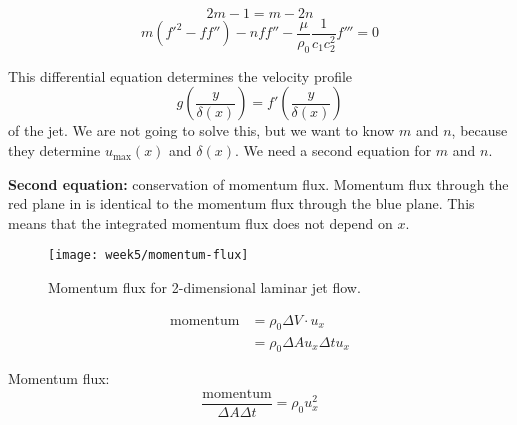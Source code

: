 \begin{framed}
\begin{equation}
2m-1 = m-2n
\end{equation}
\begin{equation}
m(f'^2-ff'')-nff''-\frac{\mu}{\rho_0}\frac{1}{c_1c_2^2}f'''=0
\end{equation}
\end{framed}

This differential equation determines the velocity profile
\begin{equation}
g\left(\frac{y}{\delta(x)}\right)=f'\left(\frac{y}{\delta(x)}\right)
\end{equation}
of the jet. We are not going to solve this, but we want to know $m$ and $n$, because they determine $u_\mathrm{max}(x)$ and $\delta(x)$. We need a second equation for $m$ and $n$.

\textbf{Second equation:} conservation of momentum flux.
Momentum flux through the red plane in  is identical to the momentum flux through the blue plane. This means that the integrated momentum flux does not depend on $x$.
\begin{figure}[!h]
    \centering
    \texttt{[image: week5/momentum-flux]}\\
    \caption{Momentum flux for 2-dimensional laminar jet flow.}
    \label{fig:momentum-flux}
\end{figure}

\begin{align}
\mathrm{momentum} & =\rho_0\Delta V\cdot u_x\\
&= \rho_0\Delta Au_x\Delta tu_x
\end{align}

Momentum flux:
\begin{equation}
\frac{\mathrm{momentum}}{\Delta A \Delta t} = \rho_0 u_x^2
\end{equation}


